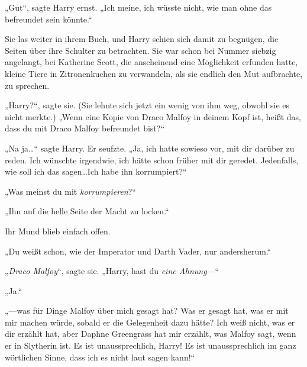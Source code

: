 „Gut“, sagte Harry ernst. „Ich meine, ich wüsste nicht, wie man ohne das befreundet sein könnte.“


Sie las weiter in ihrem Buch, und Harry schien sich damit zu begnügen, die Seiten über ihre Schulter zu betrachten. Sie war schon bei Nummer siebzig angelangt, bei Katherine Scott, die anscheinend eine Möglichkeit erfunden hatte, kleine Tiere in Zitronenkuchen zu verwandeln, als sie endlich den Mut aufbrachte, zu sprechen.

„Harry?“, sagte sie. (Sie lehnte sich jetzt ein wenig von ihm weg, obwohl sie es nicht merkte.) „Wenn eine Kopie von Draco Malfoy in deinem Kopf ist, heißt das, dass du mit Draco Malfoy befreundet bist?“

„Na ja…“ sagte Harry. Er seufzte. „Ja, ich hatte sowieso vor, mit dir darüber zu reden. Ich wünschte irgendwie, ich hätte schon früher mit dir geredet. Jedenfalls, wie soll ich das sagen…Ich habe ihn korrumpiert?“

„Was meinst du mit \emph{korrumpieren}?“

„Ihn auf die helle Seite der Macht zu locken.“

Ihr Mund blieb einfach offen.

„Du weißt schon, wie der Imperator und Darth Vader, nur andersherum.“

„\emph{Draco Malfoy}“, sagte sie. „Harry, hast du \emph{eine Ahnung}—“

„Ja.“

„—was für Dinge Malfoy über mich gesagt hat? Was er gesagt hat, was er mit mir machen würde, sobald er die Gelegenheit dazu hätte? Ich weiß nicht, was er dir erzählt hat, aber Daphne Greengrass hat mir erzählt, was Malfoy sagt, wenn er in Slytherin ist. Es ist unaussprechlich, Harry! Es ist unaussprechlich im ganz wörtlichen Sinne, dass ich es nicht laut sagen kann!“


